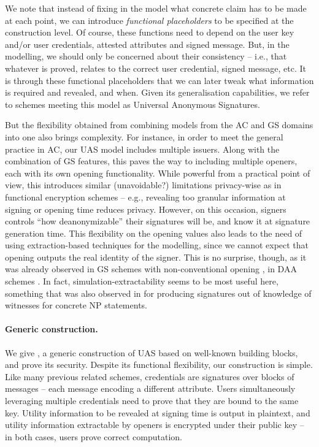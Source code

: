 We note that instead of fixing in the model what concrete claim has to
be made at each point, we can introduce \emph{functional placeholders} to be
specified at the construction level. Of course, these functions need
to depend on the user key and/or user credentials, attested attributes and
signed message. But, in the modelling, we should only be concerned about their
consistency -- i.e., that whatever is proved, relates to the correct user
credential, signed message, etc.
%
It is through these functional placeholders that we can later tweak what
information is required and revealed, and when. Given its generalisation
capabilities, we refer to schemes meeting this model as Universal Anonymous
Signatures.

But the flexibility obtained from combining models from the AC and GS
domains into one also brings complexity. For instance, in order to meet
the general practice in AC, our UAS model includes multiple issuers. Along with
the combination of GS features, this paves the way to including multiple
openers, each with its own opening functionality. While powerful from a
practical point of view, this introduces similar (unavoidable?) limitations
privacy-wise as in functional encryption schemes \cite{bsw11} -- e.g., revealing
too granular information at signing or opening time reduces privacy. However, on
this occasion, signers controls ``how deanonymizable'' their signatures will
be, and know it at signature generation time. This flexibility on the opening
values also leads to the need of using extraction-based techniques for the
modelling, since we cannot expect that opening outputs the real identity of the
signer. This is no surprise, though, as it was already observed in GS schemes
with non-conventional opening \cite{dl21}, in DAA schemes \cite{cdl16,cdl16b}.
In fact, simulation-extractability seems to be most useful here, something that
was also observed in \cite{cl06} for producing signatures out of knowledge of
witnesses for concrete NP statements.

\paragraph{Generic construction.} %
We give \CUASGen, a generic construction of UAS based on well-known
building blocks, and prove its security. Despite its functional flexibility, our
construction is simple. Like many previous related schemes, credentials are
signatures over blocks of messages -- each message encoding a different
attribute. Users simultaneously leveraging multiple credentials need to prove
that they are bound to the same key. Utility information to be revealed at
signing time is output in plaintext, and utility information extractable by
openers is encrypted under their public key -- in both cases, users prove
correct computation.

